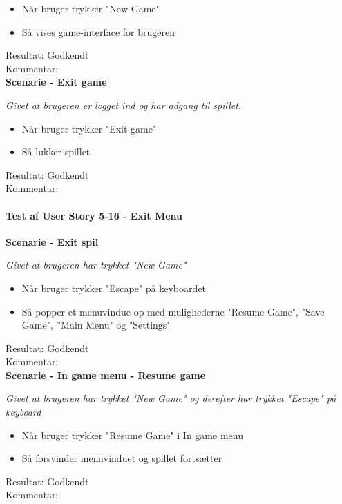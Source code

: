 \begin{itemize}
  \item Når bruger trykker "New Game"
  \item Så vises game-interface for brugeren
\end{itemize}

Resultat: Godkendt\\
Kommentar:\\

\bf{Scenarie - Exit game}

\it{Givet at brugeren er logget ind og har adgang til spillet.}

\begin{itemize}
  \item Når bruger trykker "Exit game"
  \item Så lukker spillet
\end{itemize}

Resultat: Godkendt\\
Kommentar:\\

\paragraph{Test af User Story 5-16 - Exit Menu}

\bf{Scenarie - Exit spil}

\it{Givet at brugeren har trykket "New Game"}

\begin{itemize}
  \item Når bruger trykker "Escape" på keyboardet
  \item Så popper et menuvindue op med mulighederne "Resume Game", "Save Game", ”Main Menu" og "Settings"
\end{itemize}

Resultat: Godkendt\\
Kommentar:\\

\bf{Scenarie - In game menu - Resume game}

\it{Givet at brugeren har trykket "New Game" og derefter har trykket "Escape" på keyboard}

\begin{itemize}
  \item Når bruger trykker "Resume Game" i In game menu
  \item Så forsvinder menuvinduet og spillet fortsætter
\end{itemize}

Resultat: Godkendt\\
Kommentar:\\

